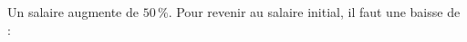 
Un salaire augmente de $50\,\%$. Pour revenir au salaire initial, il faut une baisse de :

\smallskip

